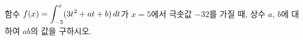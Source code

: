 함수 $f(x)=\displaystyle\int_{-3}^{x}(3t^2+at+b)\mkern3mu dt$가 $x=5$에서 극솟값 $-32$를 가질 때, 상수 $a$, $b$에 대하여 $ab$의 값을 구하시오.
